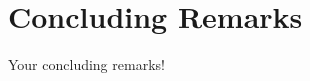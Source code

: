\documentclass[
10pt, %
a4paper, %
oneside, %
headinclude,footinclude, %
BCOR5mm, %
]{scrartcl}
\begin{document}
\section{Concluding Remarks}
Your concluding remarks!


\renewcommand{\refname}{\spacedlowsmallcaps{References}} %




\end{document}
